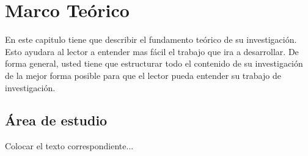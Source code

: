 \chapter{Marco Teórico}
\label{cap2}

En este capitulo tiene que describir el fundamento teórico de su investigación. Esto ayudara al lector a entender mas fácil el trabajo que ira a desarrollar. De forma general, usted tiene que estructurar todo el contenido de su investigación de la mejor forma posible para que el lector pueda entender su trabajo de investigación. 

\section{Área de estudio}
Colocar el texto correspondiente...